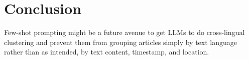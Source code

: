 \section{Conclusion}\label{section:conclusion}

Few-shot prompting might be a future avenue to get LLMs to do cross-lingual clustering and prevent them from grouping articles simply by text language rather than as intended, by text content, timestamp, and location.